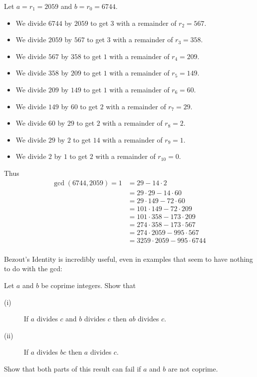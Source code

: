 \documentclass[11pt,dvipsnames]{book}
\numberwithin{figure}{section} %
\numberwithin{table}{section} %
\begin{document}
\begin{example}
Let $a = r_1 = 2059$ and $b = r_0 = 6744$.
\begin{itemize}
    \item We divide $6744$ by $2059$ to get $3$ with a remainder of $r_2=567$.
    \item We divide $2059$ by $567$ to get $3$ with a remainder of $r_3 = 358$.
    \item We divide $567$ by $358$ to get $1$ with a remainder of $r_4 = 209$.
    \item We divide $358$ by $209$ to get $1$ with a remainder of $r_5 = 149$.
    \item We divide $209$ by $149$ to get $1$ with a remainder of $r_6 = 60$.
    \item We divide $149$ by $60$ to get $2$ with a remainder of $r_7 = 29$.
    \item We divide $60$ by $29$ to get $2$ with a remainder of $r_8 = 2$.
    \item We divide $29$ by $2$ to get $14$ with a remainder of $r_9 = 1$.
    \item We divide $2$ by $1$ to get $2$ with a remainder of $r_{10} = 0$.
\end{itemize}
Thus
\begin{align*}
    \gcd(6744, 2059) = 1 &= 29 - 14\cdot 2 \\
    &= 29\cdot 29 - 14 \cdot 60 \\
    &= 29\cdot 149-72\cdot 60 \\
    &= 101\cdot 149-72\cdot 209 \\
    &= 101\cdot 358-173\cdot 209 \\
    &= 274\cdot 358-173\cdot 567 \\
    &= 274\cdot 2059-995\cdot 567 \\
    &= 3259\cdot 2059-995\cdot 6744 \\
\end{align*}
\end{example}

Bezout's Identity is incredibly useful, even in examples that seem to have nothing to do with the gcd:

\begin{exercise}
Let $a$ and $b$ be coprime integers. Show that
\begin{description}
\item[(i)] If  $a$ divides $c$ and $b$ divides $c$ then $ab$ divides $c$.
\item[(ii)] If $a$ divides $bc$ then $a$ divides $c$.
\end{description}
Show that both parts of this result can fail if $a$ and $b$ are not coprime.
\end{exercise}
\end{document}
